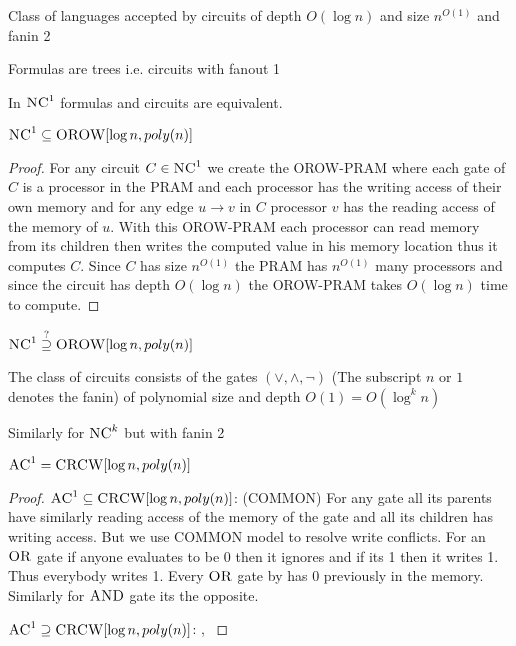 \begin{definition}[$\textsc{NC}^1$]
	Class of languages accepted by circuits of depth $O(\log n)$  and size $n^{O(1)}$ and fanin 2
\end{definition}
\begin{definition}
	Formulas are trees i.e. circuits with fanout 1
\end{definition}
\begin{theorem}
	In $\textsc{NC}^1$ formulas and circuits are equivalent.
\end{theorem}
\begin{theorem}
	$\textsc{NC}^1\subseteq \textsc{OROW}[\log n, poly(n)]$
\end{theorem}
\begin{proof}
	For any circuit $C\in \textsc{NC}^1$  we create the \textsc{OROW-PRAM} where each gate of $C$ is a processor in the \textsc{PRAM} and each processor has the writing access of their own memory and for any edge $u\to v$ in $C$ processor $v$ has the reading access of the memory of $u$. With this \textsc{OROW-PRAM} each processor can read memory from its children then writes the computed value in his memory location thus it computes $C$. Since $C$ has size $n^{O(1)}$ the \textsc{PRAM} has $n^{O(1)}$ many processors and since the circuit has depth $O(\log n)$ the \textsc{OROW-PRAM} takes $O(\log n)$ time to compute. 
\end{proof}
\begin{open}
	$\textsc{NC}^1\overset{?}{\supseteq} \textsc{OROW}[\log n,poly(n)]$
\end{open}
\begin{definition}
		The class of circuits consists of the gates $(\vee,\wedge,\neg)$ (The subscript $n$ or $1$ denotes the fanin) of polynomial size and depth $O(1)=O(\log^k n)$ 
		
		Similarly for $\textsc{NC}^k$ but with fanin 2
\end{definition}
\begin{theorem}
	$\textsc{AC}^1=\textsc{CRCW}[\log n,poly(n)]$
\end{theorem}
\begin{proof} $\textsc{AC}^1\subseteq \textsc{CRCW}[\log n,poly(n)]$: (\textsc{COMMON}) For any gate all its parents have similarly reading  access of the memory of the gate and all its children has writing access. But we use \textsc{COMMON} model to resolve write conflicts. For an $\textsc{OR}$ gate if anyone evaluates to be 0 then it ignores and if its 1 then it writes 1. Thus everybody writes 1. Every $\textsc{OR}$ gate by  has 0 previously in the memory. Similarly for $\textsc{AND}$ gate its the opposite. 


$\textsc{AC}^1\supseteq \textsc{CRCW}[\log n,poly(n)]$: , \cite{StockmeyerVishkin_1984_SoP}
\end{proof}

